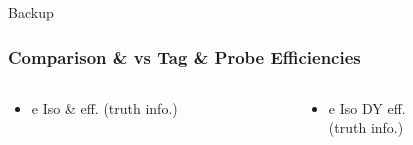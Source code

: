 \documentclass{beamer}
\begin{document}
\begin{frame}
 \begin{block}{}
 \centering
 \Large Backup
 \end{block}
\end{frame}

\begin{frame}
 \frametitle{Comparison \ttbar \& \wpj vs Tag \& Probe Efficiencies}
  \begin{columns}

   \begin{column}{0.33\textwidth}
     \begin{itemize}
   \item e Iso \ttbar \& \wpj eff. (truth info.)
  \end{itemize}
   \end{column}
   \begin{column}{0.33\textwidth}
   \begin{itemize}
    \item e Iso DY eff.\\ (truth info.)
   \end{itemize}


\end{column}
\end{columns}
\end{frame}
\end{document}
